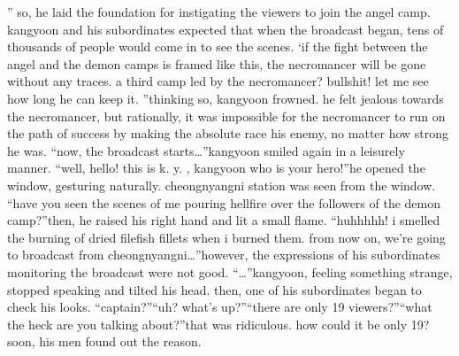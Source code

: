 ”
so, he laid the foundation for instigating the viewers to join the angel camp.
kangyoon and his subordinates expected that when the broadcast began, tens of thousands of people would come in to see the scenes.
‘if the fight between the angel and the demon camps is framed like this, the necromancer will be gone without any traces.
 a third camp led by the necromancer? bullshit! let me see how long he can keep it.
”thinking so, kangyoon frowned.
 he felt jealous towards the necromancer, but rationally, it was impossible for the necromancer to run on the path of success by making the absolute race his enemy, no matter how strong he was.
“now, the broadcast starts…”kangyoon smiled again in a leisurely manner.
“well, hello! this is k.
y.
, kangyoon who is your hero!”he opened the window, gesturing naturally.
 cheongnyangni station was seen from the window.
“have you seen the scenes of me pouring hellfire over the followers of the demon camp?”then, he raised his right hand and lit a small flame.
“huhhhhh! i smelled the burning of dried filefish fillets when i burned them.
 from now on, we’re going to broadcast from cheongnyangni…”however, the expressions of his subordinates monitoring the broadcast were not good.
“…”kangyoon, feeling something strange, stopped speaking and tilted his head.
then, one of his subordinates began to check his looks.
“captain?”“uh? what’s up?”“there are only 19 viewers?”“what the heck are you talking about?”that was ridiculous.
 how could it be only 19? soon, his men found out the reason.

